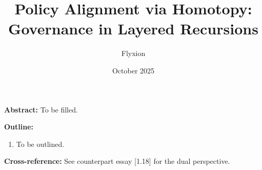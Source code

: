 \documentclass[12pt,a4paper]{article}
\title{Policy Alignment via Homotopy: Governance in Layered Recursions}
\author{Flyxion}
\date{October 2025}
\begin{document}
\maketitle
\textbf{Abstract:} To be filled.

\bigskip
\textbf{Outline:}
\begin{enumerate}
\item To be outlined.
\end{enumerate}

\bigskip
\textbf{Cross-reference:} See counterpart essay [1.18] for the dual perspective.
\end{document}
